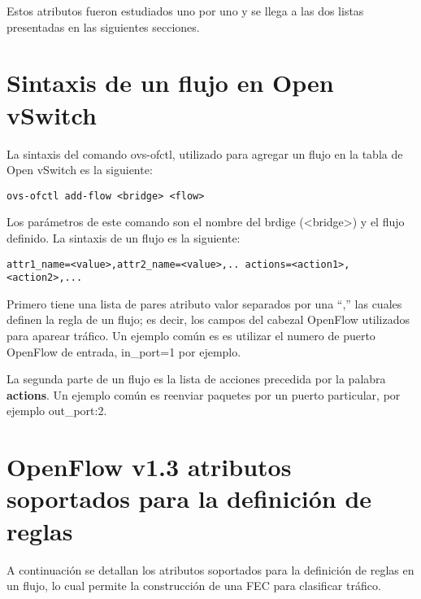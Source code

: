Estos atributos fueron estudiados uno por uno y se llega a las dos listas presentadas en las siguientes secciones.\\

\section{Sintaxis de un flujo en Open vSwitch}
La sintaxis del comando ovs-ofctl, utilizado para agregar un flujo en la tabla de Open vSwitch es la siguiente:


\begin{center}
\texttt{ovs-ofctl add-flow <bridge> <flow>}
\end{center}

Los parámetros de este comando son el nombre del brdige (<bridge>) y el flujo definido. La sintaxis de un flujo es la siguiente:

\begin{center}
\texttt{attr1\_name=<value>,attr2\_name=<value>,.. actions=<action1>,<action2>,...}
\end{center}

Primero tiene una lista de pares atributo valor separados por una “,” las cuales definen la regla de un flujo; es decir, los campos del cabezal OpenFlow utilizados para aparear tr\'afico. Un ejemplo común es es utilizar el numero de puerto OpenFlow de entrada, in\_port=1 por ejemplo.

La segunda parte de un flujo es la lista de acciones precedida por la palabra \textbf{actions}. Un ejemplo común es reenviar paquetes por un puerto particular, por ejemplo out\_port:2. 
 
\section{OpenFlow v1.3 atributos soportados para la definici\'on de reglas}

A continuaci\'on se detallan los atributos soportados para la definici\'on de reglas en un flujo, lo cual permite la construcci\'on de una FEC para clasificar tr\'afico.

